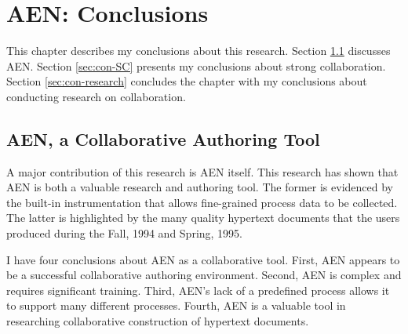 

\chapter{AEN: Conclusions}
\label{sec:conclusions}

This chapter describes my conclusions about this research. Section
\ref{sec:con-AEN} discusses AEN.  Section \ref{sec:con-SC} presents my
conclusions about strong collaboration.  Section \ref{sec:con-research}
concludes the chapter with my conclusions about conducting research on
collaboration.

\section{AEN, a Collaborative Authoring Tool}
\label{sec:con-AEN}
A major contribution of this research is AEN itself.  This research has
shown that AEN is both a valuable research and authoring tool.  The former
is evidenced by the built-in instrumentation that allows fine-grained
process data to be collected.  The latter is highlighted by the many
quality hypertext documents that the users produced during the Fall, 1994
and Spring, 1995.


I have four conclusions about AEN as a collaborative tool.  First, AEN
appears to be a successful collaborative authoring environment.  Second,
AEN is complex and requires significant training.  Third, AEN's lack of a
predefined process allows it to support many different processes.  Fourth,
AEN is a valuable tool in researching collaborative construction of
hypertext documents.

